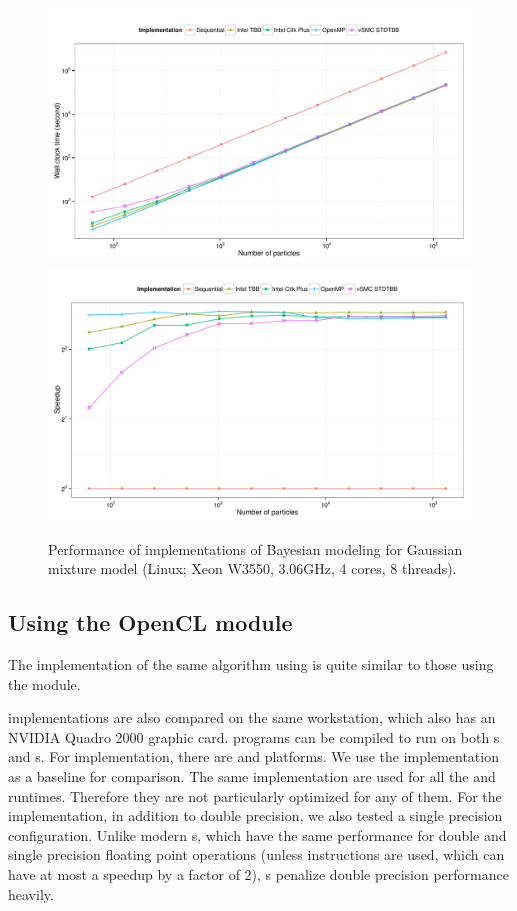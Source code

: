 \begin{figure}
  \centering
  \includegraphics[width=\linewidth]{fig/bench-smp-time-running}
  \includegraphics[width=\linewidth]{fig/bench-smp-speedup-running}
  \caption{Performance of \cpp implementations of Bayesian modeling for
    Gaussian mixture model (Linux; Xeon W3550, 3.06GHz, 4 cores, 8 threads).}
  \label{fig:bench-smp-perf}
\end{figure}

\subsection{Using the OpenCL module}
\label{sub:Using the module}

The implementation of the same algorithm using \opencl is quite similar to
those using the \smp module.

\opencl implementations are also compared on the same workstation, which also
has an NVIDIA Quadro 2000 graphic card. \opencl programs can be compiled to
run on both \cpu{}s and \gpu{}s. For \cpu implementation, there are \iocl and
\aocl platforms. We use the \tbb implementation as a baseline for comparison.
The same \opencl implementation are used for all the \cpu and \gpu runtimes.
Therefore they are not particularly optimized for any of them. For the \gpu
implementation, in addition to double precision, we also tested a single
precision configuration.  Unlike modern \cpu{}s, which have the same
performance for double and single precision floating point operations (unless
\simd instructions are used, which can have at most a speedup by a factor of
2), \gpu{}s penalize double precision performance heavily.

